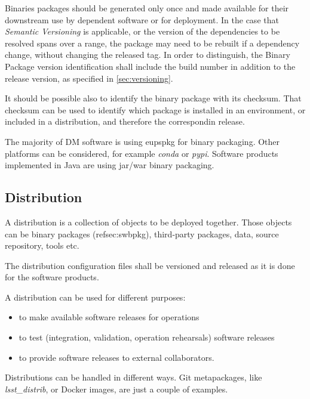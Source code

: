 Binaries packages should be generated only once and made available for their downstream use by dependent software or for deployment.
In the case that \textit{Semantic Versioning} is applicable, or the version of the dependencies to be resolved spans over a range, the package may need to be rebuilt if a dependency change, without changing the released tag.
In order to distinguish, the Binary Package version identification shall include the build number in addition to the release version, as specified in \ref{sec:versioning}. 

It should be possible also to identify the binary package with its checksum.
That checksum can be used to identify which package is installed in an environment, or included in a distribution, and therefore the correspondin release.

The majority of DM software is using eupspkg for binary packaging. Other platforms can be considered, for example \textit{conda} or \textit{pypi}.
Software products implemented in Java are using jar/war binary packaging.


\subsection{Distribution} \label{sec:distribution}

A distribution is a collection of objects to be deployed together.
Those objects can be binary packages (ref{sec:swbpkg}), third-party packages, data, source repository, tools etc.

The distribution configuration files shall be versioned and released as it is done for the software products.

A distribution can be used for different purposes:

\begin{itemize}
\item to make available software releases for operations
\item to test (integration, validation, operation rehearsals) software releases
\item to provide software releases to external collaborators.
\end{itemize}

Distributions can be handled in different ways.
Git metapackages, like \textit{lsst\_distrib}, or Docker images, are just a couple of examples.

